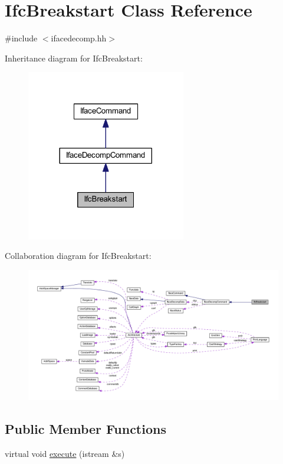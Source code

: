 \hypertarget{class_ifc_breakstart}{}\section{Ifc\+Breakstart Class Reference}
\label{class_ifc_breakstart}


{\ttfamily \#include $<$ifacedecomp.\+hh$>$}



Inheritance diagram for Ifc\+Breakstart\+:
\nopagebreak
\begin{figure}[H]
\begin{center}
\leavevmode
\includegraphics[width=197pt]{class_ifc_breakstart__inherit__graph}
\end{center}
\end{figure}


Collaboration diagram for Ifc\+Breakstart\+:
\nopagebreak
\begin{figure}[H]
\begin{center}
\leavevmode
\includegraphics[width=350pt]{class_ifc_breakstart__coll__graph}
\end{center}
\end{figure}
\subsection*{Public Member Functions}
\begin{DoxyCompactItemize}
\item 
virtual void \mbox{\hyperlink{class_ifc_breakstart_a501a27b150ccb020030d0b0156890353}{execute}} (istream \&s)
\end{DoxyCompactItemize}
